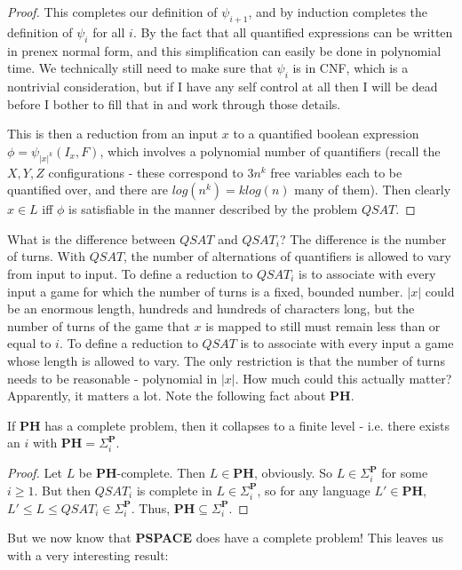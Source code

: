 \begin{proof}
    \par This completes our definition of $\psi_{i+1}$, and by induction completes the definition of $\psi_i$ for all $i$. By the fact that all quantified expressions can be written in prenex normal form, and this simplification can easily be done in polynomial time. We technically still need to make sure that $\psi_i$ is in CNF, which is a nontrivial consideration, but if I have any self control at all then I will be dead before I bother to fill that in and work through those details.
    \par This is then a reduction from an input $x$ to a quantified boolean expression $\phi = \psi_{|x|^k}(I_x,F)$, which involves a polynomial number of quantifiers (recall the $X,Y,Z$ configurations - these correspond to $3n^k$ free variables each to be quantified over, and there are $log(n^k)=klog(n)$ many of them). Then clearly $x \in L$ iff $\phi$ is satisfiable in the manner described by the problem $QSAT$.  
\end{proof}
What is the difference between $QSAT$ and $QSAT_i$? The difference is the number of turns. With $QSAT$, the number of alternations of quantifiers is allowed to vary from input to input. To define a reduction to $QSAT_i$ is to associate with every input a game for which the number of turns is a fixed, bounded number. $|x|$ could be an enormous length, hundreds and hundreds of characters long, but the number of turns of the game that $x$ is mapped to still must remain less than or equal to $i$. To define a reduction to $QSAT$ is to associate with every input a game whose length is allowed to vary. The only restriction is that the number of turns needs to be reasonable - polynomial in $|x|$. How much could this actually matter? Apparently, it matters a lot. Note the following fact about \textbf{PH}.
\begin{theorem}
    If \textbf{PH} has a complete problem, then it collapses to a finite level - i.e. there exists an $i$ with $\textbf{PH} = \Sigma_i^{\textbf{P}}$. 
\end{theorem}
\begin{proof}
    Let $L$ be \textbf{PH}-complete. Then $L \in \textbf{PH}$, obviously. So $L \in \Sigma_i^{\textbf{P}}$ for some $i \geq 1$. But then $QSAT_i$ is complete in $L \in \Sigma_i^{\textbf{P}}$, so for any language $L' \in \textbf{PH}$, $L' \leq L \leq QSAT_i \in \Sigma_i^{\textbf{P}}$. Thus, $\textbf{PH} \subseteq \Sigma_i^{\textbf{P}}$.
\end{proof}
But we now know that \textbf{PSPACE} does have a complete problem! This leaves us with a very interesting result:
